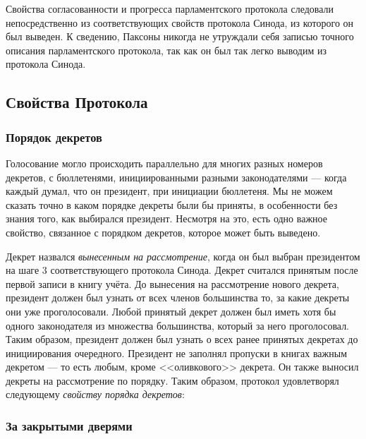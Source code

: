 \documentclass[12pt, a4paper]{article} %
\begin{document}
Свойства согласованности и прогресса парламентского протокола следовали непосредственно из соответствующих свойств протокола Синода, из которого он был выведен. К сведению, Паксоны никогда не утруждали себя записью точного описания парламентского протокола, так как он был так легко выводим из протокола Синода.

\subsection{Свойства Протокола}\label{sec:props}
\subsubsection{Порядок декретов}

Голосование могло происходить параллельно для многих разных номеров декретов, с бюллетенями, инициированными разными законодателями --- когда каждый думал, что он президент, при инициации бюллетеня. Мы не можем сказать точно в каком порядке декреты были бы приняты, в особенности без знания того, как выбирался президент. Несмотря на это, есть одно важное свойство, связанное с порядком декретов, которое может быть выведено.

Декрет назвался \textit{вынесенным на рассмотрение}, когда он был выбран президентом на шаге 3 соответствующего протокола Синода. Декрет считался принятым после первой записи в книгу учёта.  До вынесения на рассмотрение нового декрета, президент должен был узнать от всех членов большинства то, за какие декреты они уже проголосовали. Любой принятый декрет должен был иметь хотя бы одного законодателя из множества большинства, который за него проголосовал. Таким образом, президент должен был узнать о всех ранее принятых декретах до инициирования очередного. Президент не заполнял пропуски в книгах важным декретом --- то есть любым, кроме <<оливкового>> декрета. Он также выносил декреты на рассмотрение по порядку. Таким образом, протокол удовлетворял следующему \textit{свойству порядка декретов}:


\subsubsection{За закрытыми дверями}
\end{document}
